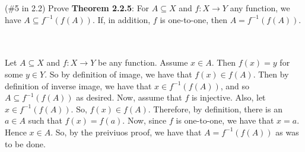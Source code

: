 (\#5 in 2.2) Prove \textbf{Theorem 2.2.5}: For $A\subseteq X$ and $f:X\to Y$ any function, we have
$A\subseteq f^{-1}(f(A))$. If, in addition, $f$ is one-to-one, then $A=f^{-1}(f(A))$.\\\\

\begin{solution}\renewcommand{\qedsymbol}{}\ \\
    Let $A\subseteq X$ and $f:X\to Y$ be any function. Assume $x\in A$. Then $f(x)=y$ for some $y\in Y$.
    So by definition of image, we have that $f(x)\in f(A)$. Then by definition of inverse image, we have
    that $x\in f^{-1}(f(A))$, and so $A\subseteq f^{-1}(f(A))$ as desired. Now, assume that $f$ is
    injective. Also, let $x\in f^{-1}(f(A))$. So, $f(x)\in f(A)$. Therefore, by definition, there is an
    $a\in A$ such that $f(x)=f(a)$. Now, since $f$ is one-to-one, we have that $x=a$. Hence $x\in A$.
    So, by the preiviuos proof, we have that $A=f^{-1}(f(A))$ as was to be done.

\end{solution}